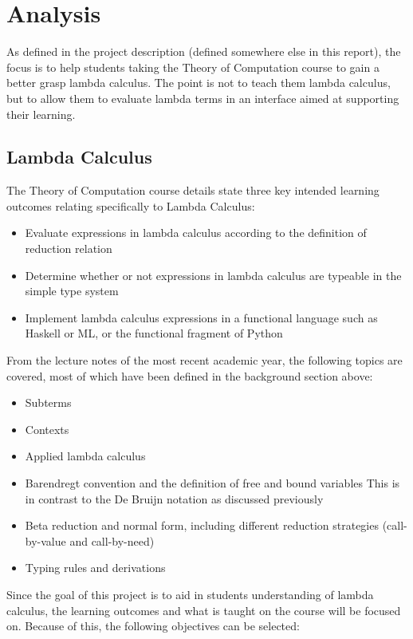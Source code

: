 \documentclass[a4paper,12pt]{report}
\begin{document}

\chapter{Analysis}
As defined in the project description (defined somewhere else in this report), the focus is to help students taking the Theory of Computation course to gain a better grasp lambda calculus. The point is not to teach them lambda calculus, but to allow them to evaluate lambda terms in an interface aimed at supporting their learning.

\section{Lambda Calculus}
The Theory of Computation course details \cite{CourseSpecification} state three key intended learning outcomes relating specifically to Lambda Calculus:

\begin{itemize}
	\item Evaluate expressions in lambda calculus according to the definition of reduction relation
	\item Determine whether or not expressions in lambda calculus are typeable in the simple type system
	\item Implement lambda calculus expressions in a functional language such as Haskell or ML, or the functional fragment of Python
\end{itemize}

From the lecture notes of the most recent academic year, the following topics are covered, most of which have been defined in the background section above:

\begin{itemize}
	\item Subterms
	\item Contexts
	\item Applied lambda calculus
	\item Barendregt convention and the definition of free and bound variables
	\subitem This is in contrast to the De Bruijn notation as discussed previously
	\item Beta reduction and normal form, including different reduction strategies (call-by-value and call-by-need)
	\item Typing rules and derivations
\end{itemize}

Since the goal of this project is to aid in students understanding of lambda calculus, the learning outcomes and what is taught on the course will be focused on. Because of this, the following objectives can be selected:
\end{document}
